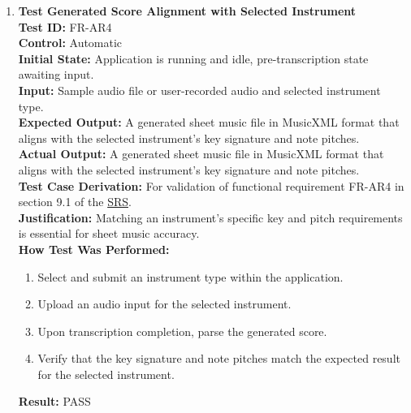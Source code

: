 \documentclass[12pt, titlepage]{article}
\begin{document}
\begin{enumerate}
  \item \textbf{Test Generated Score Alignment with Selected Instrument} \\
    \newline
    \textbf{Test ID:} FR-AR4 \\
    \textbf{Control:} Automatic \\
    \textbf{Initial State:} Application is running and idle, pre-transcription state awaiting input. \\
    \textbf{Input:} Sample audio file or user-recorded audio and selected instrument type. \\
    \textbf{Expected Output:} A generated sheet music file in MusicXML format that aligns with the selected instrument’s key signature 
    and note pitches. \\
    \textbf{Actual Output:} A generated sheet music file in MusicXML format that aligns with the selected instrument’s key signature 
    and note pitches. \\
    \textbf{Test Case Derivation:} For validation of functional requirement FR-AR4 in section 9.1 of the 
    \href{https://github.com/emilyperica/ScoreGen/blob/main/docs/SRS-Volere/SRS.pdf}{SRS}.\\
    \textbf{Justification:} Matching an instrument's specific key and pitch requirements is essential for sheet music accuracy. \\
    \textbf{How Test Was Performed:}
    \begin{enumerate}
        \item Select and submit an instrument type within the application.
        \item Upload an audio input for the selected instrument.
        \item Upon transcription completion, parse the generated score.
        \item Verify that the key signature and note pitches match the expected result for the selected instrument.
    \end{enumerate}
    \textbf{Result:} PASS
  \end{enumerate}
  
\end{document}
